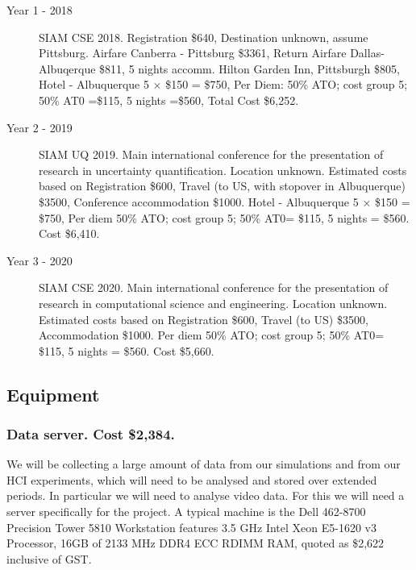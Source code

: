 \documentclass[a4paper,twoside,12pt,compact]{article}
\begin{document}
\begin{description}
\item[Year 1 - 2018] SIAM CSE 2018.
Registration \$640, 
Destination unknown, assume Pittsburg.
Airfare Canberra - Pittsburg \$3361,
Return Airfare Dallas-Albuqerque \$811,
5 nights accomm. Hilton Garden Inn, Pittsburgh \$805,  
Hotel - Albuquerque 5 $\times$  \$150 = \$750,
Per Diem: 50\% ATO; cost group 5; 50\% AT0 =\$115, 5 nights =\$560, Total Cost \$6,252.

\item[Year 2 - 2019] SIAM UQ 2019.
Main international conference for the presentation of research in uncertainty quantification. Location unknown.
Estimated costs based on 
Registration \$600,
Travel (to US, with stopover in Albuquerque) \$3500, 
Conference accommodation \$1000.
Hotel - Albuquerque 5 $\times$  \$150 = \$750,
Per diem 50\% ATO; cost group 5; 50\% AT0= \$115, 5 nights = \$560. Cost \$6,410.

\item[Year 3 - 2020]  SIAM CSE 2020.
Main international conference for the presentation of research in computational science and engineering. Location unknown.
Estimated costs based on 
Registration \$600,
Travel (to US) \$3500, 
Accommodation \$1000.
Per diem 50\% ATO; cost group 5; 50\% AT0= \$115, 5 nights = \$560. Cost \$5,660.

\end{description}

\subsection*{Equipment}

\subsubsection*{Data server. Cost \$2,384.}

We will be collecting a large amount of data from our simulations and from our HCI experiments, which will need to be analysed and stored over extended periods. In particular we will need to analyse video data.  For this we will need a server specifically for the project. A typical machine is the Dell 462-8700 Precision Tower 5810 Workstation features 3.5 GHz Intel Xeon E5-1620 v3 Processor, 16GB of 2133 MHz DDR4 ECC RDIMM RAM, quoted as \$2,622 inclusive of GST.  


\end{document}
